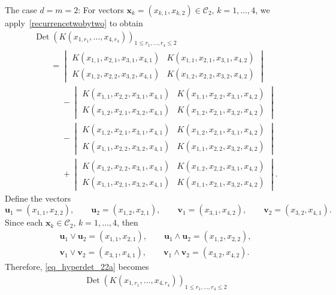 \documentclass[10pt,a4paper]{amsart}
\numberwithin{equation}{section}
\def\Det{\operatorname{Det}}
\def\CC{\mathcal{C}}
\def\uu{\boldsymbol{u}}
\def\vv{\boldsymbol{v}}
\def\xx{\boldsymbol{x}}
\begin{document}
\begin{Example}
\label{classicalhtp}
The case $d = m = 2$: For vectors $\xx_k = (x_{k,1},x_{k,2}) \in \CC_2$, $k = 1,\dots,4$, we apply~\eqref{recurrencetwobytwo} to obtain
\begin{gather}
\Det(K(x_{1,r_1},\dots, x_{4,r_4}))_{1 \le r_1,\dots,r_4 \le 2} \nonumber \\
\qquad=
\begin{vmatrix}
K(x_{1,1},x_{2,1},x_{3,1},x_{4,1}) & K(x_{1,1},x_{2,1},x_{3,1},x_{4,2}) \\
K(x_{1,2},x_{2,2},x_{3,2},x_{4,1}) & K(x_{1,2},x_{2,2},x_{3,2},x_{4,2})
\end{vmatrix} \nonumber \\
\phantom{\qquad= }{} -
\begin{vmatrix}
K(x_{1,1},x_{2,2},x_{3,1},x_{4,1}) & K(x_{1,1},x_{2,2},x_{3,1},x_{4,2}) \\
K(x_{1,2},x_{2,1},x_{3,2},x_{4,1}) & K(x_{1,2},x_{2,1},x_{3,2},x_{4,2})
\end{vmatrix} \nonumber \\
\phantom{\qquad= }{} -
\begin{vmatrix}
K(x_{1,2},x_{2,1},x_{3,1},x_{4,1}) & K(x_{1,2},x_{2,1},x_{3,1},x_{4,2}) \\
K(x_{1,1},x_{2,2},x_{3,2},x_{4,1}) & K(x_{1,1},x_{2,2},x_{3,2},x_{4,2})
\end{vmatrix} \nonumber \\
\phantom{\qquad= }{} +
\begin{vmatrix}
K(x_{1,2},x_{2,2},x_{3,1},x_{4,1}) & K(x_{1,2},x_{2,2},x_{3,1},x_{4,2}) \\
K(x_{1,1},x_{2,1},x_{3,2},x_{4,1}) & K(x_{1,1},x_{2,1},x_{3,2},x_{4,2})
\end{vmatrix}.\label{eq_hyperdet_22a}
\end{gather}
Define the vectors
\[
\uu_1 = (x_{1,1},x_{2,2}), \qquad \uu_2 = (x_{1,2},x_{2,1}), \qquad
\vv_1 = (x_{3,1},x_{4,2}), \qquad \vv_2 = (x_{3,2},x_{4,1}).
\]
Since each $\xx_k \in \CC_2$, $k=1,\dots,4$, then
\begin{gather*}
\uu_1 \vee \uu_2 = (x_{1,1},x_{2,1}), \qquad \uu_1 \wedge \uu_2 = (x_{1,2},x_{2,2}), \\
\vv_1 \vee \vv_2 = (x_{3,1},x_{4,1}), \qquad \vv_1 \wedge \vv_2 = (x_{3,2},x_{4,2}).
\end{gather*}
Therefore, \eqref{eq_hyperdet_22a} becomes
\begin{gather}
\Det(K(x_{1,r_1},\dots, x_{4,r_4}))_{1 \le r_1,\dots,r_4 \le 2} \nonumber \\

\end{gather}
\end{Example}
\end{document}
